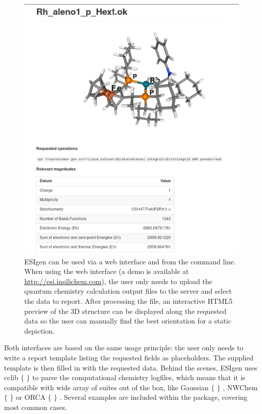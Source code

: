 \begin{figure} %
	\includegraphics[width=\textwidth]{./figures/05/esigen.png}
	\cprotect\caption[ESIgen 3D report]{ESIgen can be used via a web interface and from the command line. When using the web interface (a demo is available at \href{esi.insilichem.com}{http://esi.insilichem.com}), the user only needs to upload the quantum chemistry calculation output files to the server and select the data to report. After processing the file, an interactive HTML5 preview of the 3D structure can be displayed along the requested data so the user can manually find the best orientation for a static depiction.}
	\label{fig:esigen}
\end{figure}



Both interfaces are based on the same usage principle: the user only needs to write a report template listing the requested fields as placeholders. The supplied template is then filled in with the requested data. Behind the scenes, ESIgen uses cclib $ \{ $ $ \} $  to parse the computational chemistry logfiles, which means that it is compatible with wide array of suites out of the box, like Gaussian $ \{ $ $ \} $ , NWChem $ \{ $ $ \} $  or ORCA $ \{ $ $ \} $ . Several examples are included within the package, covering most common cases.

